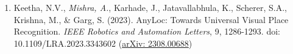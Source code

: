 
\begin{enumerate}
    \item Keetha, N.V., \emph{Mishra, A.}, Karhade, J., 
        Jatavallabhula, K., Scherer, S.A., Krishna, M., \& Garg, S. 
        (2023). AnyLoc: Towards Universal Visual Place Recognition. 
        \emph{IEEE Robotics and Automation Letters}, 9, 1286-1293. 
        doi: 10.1109/LRA.2023.3343602 
        (\href{https://arxiv.org/abs/2308.00688}{arXiv: 2308.00688})
\end{enumerate}
